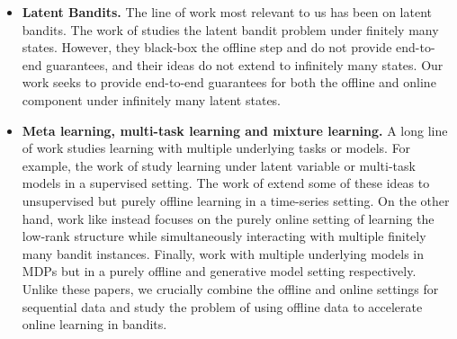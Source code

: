 \begin{itemize}  
\item \textbf{Latent Bandits.} The line of work most relevant to us has been on latent bandits. The work of \citet{hong2020latent, hong2022thompsonsamplingmixtureprior} studies the latent bandit problem under finitely many states. However, they black-box the offline step and do not provide end-to-end guarantees, and their ideas do not extend to infinitely many states. Our work seeks to provide end-to-end guarantees for both the offline and online component under infinitely many latent states.
\item \textbf{Meta learning, multi-task learning and mixture learning.} A long line of work studies learning with multiple underlying tasks or models. For example, the work of \citet{vempala2004spectral, kakade2020meta, anandkumar2014tensordecompositionslearninglatent, tripuraneni2022provablemetalearninglinearrepresentations} study learning under latent variable or multi-task models in a supervised setting. The work of \citet{kausik2023learning, poor2022mixdyn} extend some of these ideas to unsupervised but purely offline learning in a time-series setting. On the other hand, work like \citet{yang2022nearlyminimaxalgorithmslinear, cella2022metarepresentationlearningcontextual} instead focuses on the purely online setting of learning the low-rank structure while simultaneously interacting with multiple finitely many bandit instances. Finally, \citet{zhou2024federatedofflinereinforcementlearning, lu2021powermultitaskrepresentationlearning} work with multiple underlying models in MDPs but in a purely offline and generative model setting respectively. Unlike these papers, we crucially combine the offline and online settings for sequential data and study the problem of using offline data to accelerate online learning in bandits.

\end{itemize}
